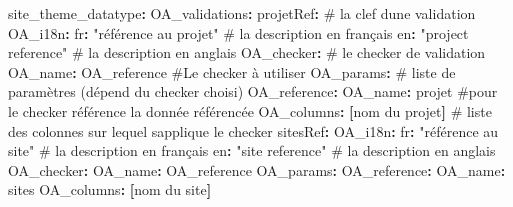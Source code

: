 \documentclass[
  letterpaper,
  DIV=11,
  numbers=noendperiod]{scrartcl}
\newenvironment{Shaded}{\begin{snugshade}}{\end{snugshade}}
\newcommand{\AttributeTok}[1]{\textcolor[rgb]{0.40,0.45,0.13}{#1}}
\newcommand{\CommentTok}[1]{\textcolor[rgb]{0.37,0.37,0.37}{#1}}
\newcommand{\FunctionTok}[1]{\textcolor[rgb]{0.28,0.35,0.67}{#1}}
\newcommand{\KeywordTok}[1]{\textcolor[rgb]{0.00,0.23,0.31}{\textbf{#1}}}
\newcommand{\StringTok}[1]{\textcolor[rgb]{0.13,0.47,0.30}{#1}}
\begin{document}
\begin{Shaded}
\begin{Highlighting}[]
\AttributeTok{  }\FunctionTok{site\_theme\_datatype}\KeywordTok{:}
\AttributeTok{    }\FunctionTok{OA\_validations}\KeywordTok{:}
\AttributeTok{      }\FunctionTok{projetRef}\KeywordTok{:}\CommentTok{ \# la clef d\textquotesingle{}une validation}
\AttributeTok{        }\FunctionTok{OA\_i18n}\KeywordTok{:}
\AttributeTok{         }\FunctionTok{fr}\KeywordTok{:}\AttributeTok{ }\StringTok{"référence au projet"}\CommentTok{ \# la description en français}
\AttributeTok{         }\FunctionTok{en}\KeywordTok{:}\AttributeTok{ }\StringTok{"project reference"}\CommentTok{ \# la description en anglais}
\AttributeTok{        }\FunctionTok{OA\_checker}\KeywordTok{:}\CommentTok{ \# le checker de validation}
\AttributeTok{          }\FunctionTok{OA\_name}\KeywordTok{:}\AttributeTok{ OA\_reference}\CommentTok{ \#Le checker à utiliser}
\AttributeTok{          }\FunctionTok{OA\_params}\KeywordTok{:}\CommentTok{ \# liste de paramètres (dépend du checker choisi)}
\AttributeTok{            }\FunctionTok{OA\_reference}\KeywordTok{:}\AttributeTok{ }
\AttributeTok{                }\FunctionTok{OA\_name}\KeywordTok{:}\AttributeTok{ projet}\CommentTok{ \#pour le checker référence la donnée référencée}
\AttributeTok{        }\FunctionTok{OA\_columns}\KeywordTok{:}\AttributeTok{ }\KeywordTok{[}\AttributeTok{nom du projet}\KeywordTok{]}
\CommentTok{        \# liste des colonnes sur lequel s\textquotesingle{}applique le checker}
\AttributeTok{      }\FunctionTok{sitesRef}\KeywordTok{:}
\AttributeTok{        }\FunctionTok{OA\_i18n}\KeywordTok{:}
\AttributeTok{         }\FunctionTok{fr}\KeywordTok{:}\AttributeTok{ }\StringTok{"référence au site"}\CommentTok{ \# la description en français}
\AttributeTok{         }\FunctionTok{en}\KeywordTok{:}\AttributeTok{ }\StringTok{"site reference"}\CommentTok{ \# la description en anglais}
\AttributeTok{        }\FunctionTok{OA\_checker}\KeywordTok{:}
\AttributeTok{          }\FunctionTok{OA\_name}\KeywordTok{:}\AttributeTok{ OA\_reference}
\AttributeTok{          }\FunctionTok{OA\_params}\KeywordTok{:}
\AttributeTok{            }\FunctionTok{OA\_reference}\KeywordTok{:}\AttributeTok{ }
\AttributeTok{                }\FunctionTok{OA\_name}\KeywordTok{:}\AttributeTok{ sites}
\AttributeTok{        }\FunctionTok{OA\_columns}\KeywordTok{:}\AttributeTok{ }\KeywordTok{[}\AttributeTok{nom du site}\KeywordTok{]}
\end{Highlighting}
\end{Shaded}
\end{document}
